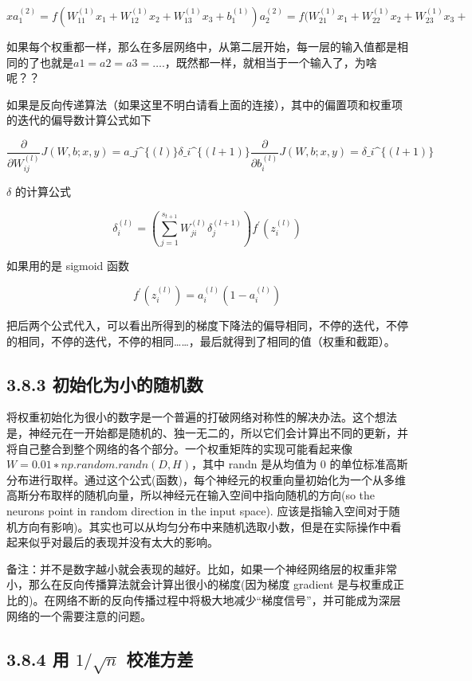 \[
xa_1^{(2)} = f(W_{11}^{(1)} x_1 + W_{12}^{(1)} x_2 + W_{13}^{(1)} x_3 + b_1^{(1)})a_2^{(2)} = f(W_{21}^{(1)} x_1 + W_{22}^{(1)} x_2 + W_{23}^{(1)} x_3 + 
\]

如果每个权重都一样，那么在多层网络中，从第二层开始，每一层的输入值都是相同的了也就是$
a1=a2=a3=\ldots{}. $，既然都一样，就相当于一个输入了，为啥呢？？

如果是反向传递算法（如果这里不明白请看上面的连接），其中的偏置项和权重项的迭代的偏导数计算公式如下

$$ \frac{\partial}{\partial W_{ij}^{(l)}} J(W,b;x,y) = a\_j\^{}\{(l)\}
\delta\_i\^{}\{(l+1)\}

\frac{\partial}{\partial b_{i}^{(l)}} J(W,b;x,y) =
\delta\_i\^{}\{(l+1)\} $$

$ \delta $ 的计算公式

\[
\delta_i^{(l)} = (\sum_{j=1}^{s_{t+1}} W_{ji}^{(l)} \delta_j^{(l+1)} ) f^{\prime}(z_i^{(l)})
\]

如果用的是 sigmoid 函数

\[
f^{\prime}(z_i^{(l)}) = a_i^{(l)}(1-a_i^{(l)})
\]

把后两个公式代入，可以看出所得到的梯度下降法的偏导相同，不停的迭代，不停的相同，不停的迭代，不停的相同\ldots{}\ldots{}，最后就得到了相同的值（权重和截距）。

\subsection{3.8.3
初始化为小的随机数}\label{ux521dux59cbux5316ux4e3aux5c0fux7684ux968fux673aux6570}

​
将权重初始化为很小的数字是一个普遍的打破网络对称性的解决办法。这个想法是，神经元在一开始都是随机的、独一无二的，所以它们会计算出不同的更新，并将自己整合到整个网络的各个部分。一个权重矩阵的实现可能看起来像
$ W=0.01∗np.random.randn(D,H) $，其中 randn 是从均值为 0
的单位标准高斯分布进行取样。通过这个公式(函数)，每个神经元的权重向量初始化为一个从多维高斯分布取样的随机向量，所以神经元在输入空间中指向随机的方向(so
the neurons point in random direction in the input space).
应该是指输入空间对于随机方向有影响)。其实也可以从均匀分布中来随机选取小数，但是在实际操作中看起来似乎对最后的表现并没有太大的影响。

​
备注：并不是数字越小就会表现的越好。比如，如果一个神经网络层的权重非常小，那么在反向传播算法就会计算出很小的梯度(因为梯度
gradient
是与权重成正比的)。在网络不断的反向传播过程中将极大地减少``梯度信号''，并可能成为深层网络的一个需要注意的问题。

\subsection{\texorpdfstring{3.8.4 用 $ 1/\sqrt n $
校准方差}{3.8.4 用 $ 1/n $ 校准方差}}\label{ux7528-1n-ux6821ux51c6ux65b9ux5dee}

